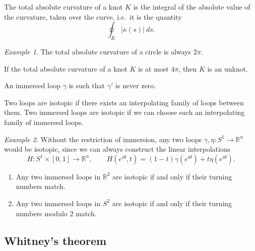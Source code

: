 \documentclass[11pt]{article}
\newcommand{\R}{\mathbb{R}}
\theoremstyle{definition}
\theoremstyle{remark}
\newtheorem*{example}{Example}
\numberwithin{equation}{section}
\begin{document}
    \begin{definition}
        The total absolute curvature of a knot $K$ is the integral of the absolute
        value of the curvature, taken over the curve, i.e.\ it is the quantity \[
            \oint_K |\kappa(s)|\:ds.
        \] 
    \end{definition}
    \begin{example}
        The total absolute curvature of a circle is always $2\pi$.
    \end{example}

    \begin{theorem}
        If the total absolute curvature of a knot $K$ is at most $4\pi$, then $K$ is
        an unknot.
    \end{theorem}

    \begin{definition}
        An immersed loop $\gamma$ is such that $\gamma'$ is never zero.
    \end{definition}

    \begin{definition}
        Two loops are isotopic if there exists an interpolating family of loops
        between them. Two immersed loops are isotopic if we can choose such an
        interpolating family of immersed loops.
    \end{definition}
    \begin{example}
        Without the restriction of immersion, any two loops $\gamma, \eta\colon S^1
        \to \R^n$ would be isotopic, since we can always construct the linear
        interpolations \[
            H\colon S^1 \times [0, 1] \to \R^n, \qquad H(e^{i\theta}, t) = (1 -
            t)\gamma(e^{i\theta}) + t\eta(e^{i\theta}).
        \] 
    \end{example}

    \begin{theorem}
        \mbox{}
        \begin{enumerate}
            \itemsep0em
            \item Any two immersed loops in $\R^2$ are isotopic if and only if their
            turning numbers match.
            \item Any two immersed loops in $S^2$ are isotopic if and only if their
            turning numbers modulo 2 match.
        \end{enumerate}
    \end{theorem}


    \subsection{Whitney's theorem}
    
\end{document}
